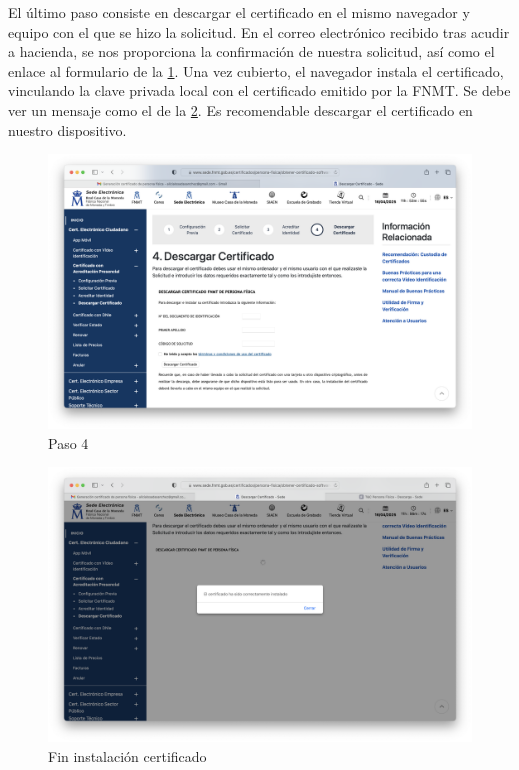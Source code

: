 El último paso consiste en descargar el certificado en el mismo navegador y equipo con el que se hizo la solicitud. En el correo electrónico recibido tras acudir a hacienda, se nos proporciona la confirmación de nuestra solicitud, así como el enlace al formulario de la \ref{fig:paso4}. Una vez cubierto, el navegador instala el certificado, vinculando la clave privada local con el certificado emitido por la FNMT. Se debe ver un mensaje como el de la \ref{fig:fin_instalacion}. Es recomendable descargar el certificado en nuestro dispositivo.  

\begin{figure}[H]   
    \includegraphics[width=\textwidth]{paso4_ej5a.png}
    \caption{Paso 4}
    \label{fig:paso4}
\end{figure}

\begin{figure}[H]   
    \includegraphics[width=\textwidth]{fin_instalacion_ej5a.png}
    \caption{Fin instalación certificado}
    \label{fig:fin_instalacion}
\end{figure}

